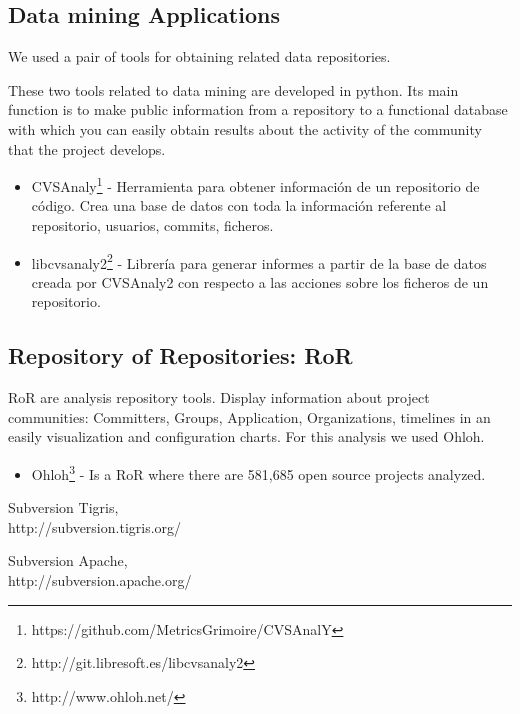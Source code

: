 \documentclass[11pt]{scrartcl}
\begin{document}
\subsection{Data mining Applications}

We used a pair of tools for obtaining related data repositories.

\par These two tools related to data mining are developed in python. Its main function is to make public information from a repository to a functional database with which you can easily obtain results about the activity of the community that the project develops.

\begin{itemize}
    \item CVSAnaly\footnote{https://github.com/MetricsGrimoire/CVSAnalY} - Herramienta para obtener información de un repositorio de código. Crea una base de datos con toda la información referente al repositorio, usuarios, commits, ficheros.
    \item libcvsanaly2\footnote{http://git.libresoft.es/libcvsanaly2} - Librería para generar informes a partir de la base de datos creada por CVSAnaly2 con respecto a las acciones sobre los ficheros de un repositorio.
\end{itemize}

\subsection{Repository of Repositories: RoR}

RoR are analysis repository tools. Display information about project communities: Committers, Groups, Application, Organizations, timelines in an easily visualization and configuration charts. For this analysis we used Ohloh.

\begin{itemize}
    \item Ohloh\footnote{http://www.ohloh.net/} - Is a RoR where there are 581,685 open source projects analyzed.
\end{itemize}

\begin{thebibliography}{9}

  Subversion Tigris,\\
  http://subversion.tigris.org/

  Subversion Apache,\\
  http://subversion.apache.org/

\end{thebibliography}
\end{document}

